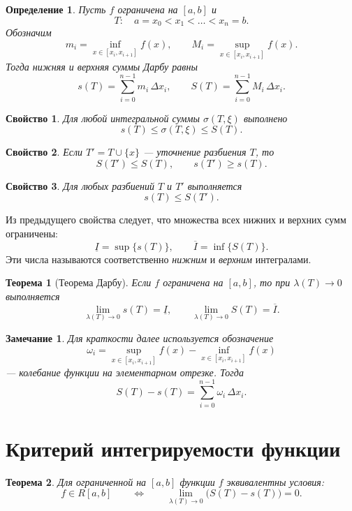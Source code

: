 \documentclass[10pt,a4paper]{article}
\theoremstyle{mystatement}
\newtheorem*{theorem}{Теорема}
\theoremstyle{mydefinition}
\newtheorem*{definition}{Определение}
\newtheorem*{prop}{Свойство}
\theoremstyle{myremark}
\newtheorem*{remark}{Замечание}
\begin{document}
\begin{definition}
Пусть $f$ ограничена на $[a,b]$ и
\[
T:\quad a=x_0<x_1<\dots<x_n=b.
\]
Обозначим
\[
 m_i=\inf\limits_{x\in[x_i,x_{i+1}]} f(x),\qquad
 M_i=\sup\limits_{x\in[x_i,x_{i+1}]} f(x).
\]
Тогда \emph{нижняя} и \emph{верхняя суммы Дарбу} равны
\[
 s(T)=\sum_{i=0}^{n-1} m_i\,\Delta x_i,\qquad
 S(T)=\sum_{i=0}^{n-1} M_i\,\Delta x_i.
\]
\end{definition}

\begin{prop}
Для любой интегральной суммы $\sigma(T,\xi)$ выполнено
\[
 s(T)\le \sigma(T,\xi)\le S(T).
\]
\end{prop}

\begin{prop}
Если $T' = T\cup\{x\}$ — уточнение разбиения $T$, то
\[
S(T')\le S(T),\qquad s(T')\ge s(T).
\]
\end{prop}

\begin{prop}
Для любых разбиений $T$ и $T'$ выполняется
\[
 s(T)\le S(T').
\]
\end{prop}

Из предыдущего свойства следует, что множества всех нижних и верхних сумм ограничены:
\[
\underline I=\sup\{s(T)\},\qquad \overline I=\inf\{S(T)\}.
\]
Эти числа называются соответственно \emph{нижним} и \emph{верхним} интегралами.

\begin{theorem}[Теорема Дарбу]
Если $f$ ограничена на $[a,b]$, то при $\lambda(T)\to 0$ выполняется
\[
\lim_{\lambda(T)\to 0}s(T)=\underline I,\qquad
\lim_{\lambda(T)\to 0}S(T)=\overline I.
\]
\end{theorem}

\begin{remark}
Для краткости далее используется обозначение
\[
\omega_i=\sup\limits_{x\in[x_i,x_{i+1}]}f(x)-\inf\limits_{x\in[x_i,x_{i+1}]}f(x)
\]
— \emph{колебание} функции на элементарном отрезке.
Тогда
\[
S(T)-s(T)=\sum_{i=0}^{n-1}\omega_i\,\Delta x_i.
\]
\end{remark}

\section{Критерий интегрируемости функции}

\begin{theorem}
Для ограниченной на $[a,b]$ функции $f$ эквивалентны условия:
\[
 f\in R[a,b]\qquad\Longleftrightarrow\qquad \lim_{\lambda(T)\to 0}\bigl(S(T)-s(T)\bigr)=0.
\]
\end{theorem}
\end{document}

